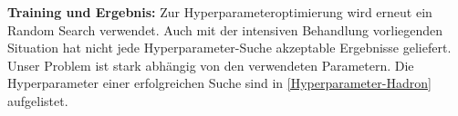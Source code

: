 \textbf{Training und Ergebnis:} Zur Hyperparameteroptimierung wird erneut ein Random Search verwendet. Auch mit der intensiven Behandlung vorliegenden Situation hat nicht jede Hyperparameter-Suche akzeptable Ergebnisse geliefert. Unser Problem ist stark abhängig von den verwendeten Parametern. %
Die Hyperparameter einer erfolgreichen Suche sind in \textsf{\autoref{Hyperparameter-Hadron}} aufgelistet. 
\begin{figure}[tbp] %
	\centering
	 \\

\end{figure}
